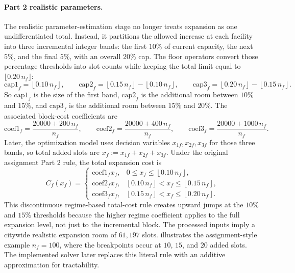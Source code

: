 \documentclass[11pt]{article}
\begin{document}
\paragraph{Part 2 realistic parameters.}
The realistic parameter-estimation stage no longer treats expansion as one undifferentiated total. Instead, it partitions the allowed increase at each facility into three incremental integer bands: the first \(10\%\) of current capacity, the next \(5\%\), and the final \(5\%\), with an overall \(20\%\) cap. The floor operators convert those percentage thresholds into slot counts while keeping the total limit equal to \(\lfloor 0.20\,n_f \rfloor\):
\[
\mathrm{cap1}_f = \left\lfloor 0.10\,n_f \right\rfloor,\qquad
\mathrm{cap2}_f = \left\lfloor 0.15\,n_f \right\rfloor - \left\lfloor 0.10\,n_f \right\rfloor,\qquad
\mathrm{cap3}_f = \left\lfloor 0.20\,n_f \right\rfloor - \left\lfloor 0.15\,n_f \right\rfloor.
\]
So \(\mathrm{cap1}_f\) is the size of the first band, \(\mathrm{cap2}_f\) is the additional room between \(10\%\) and \(15\%\), and \(\mathrm{cap3}_f\) is the additional room between \(15\%\) and \(20\%\). The associated block-cost coefficients are
\[
\mathrm{coef1}_f = \frac{20000 + 200\,n_f}{n_f},\qquad
\mathrm{coef2}_f = \frac{20000 + 400\,n_f}{n_f},\qquad
\mathrm{coef3}_f = \frac{20000 + 1000\,n_f}{n_f}.
\]
Later, the optimization model uses decision variables \(x_{1f},x_{2f},x_{3f}\) for those three bands, so total added slots are \(x_f := x_{1f}+x_{2f}+x_{3f}\). Under the original assignment Part 2 rule, the total expansion cost is
\[
C_f(x_f)=
\begin{cases}
\mathrm{coef1}_f x_f, & 0 \le x_f \le \left\lfloor 0.10\,n_f \right\rfloor,\\
\mathrm{coef2}_f x_f, & \left\lfloor 0.10\,n_f \right\rfloor < x_f \le \left\lfloor 0.15\,n_f \right\rfloor,\\
\mathrm{coef3}_f x_f, & \left\lfloor 0.15\,n_f \right\rfloor < x_f \le \left\lfloor 0.20\,n_f \right\rfloor.
\end{cases}
\]
This discontinuous regime-based total-cost rule creates upward jumps at the \(10\%\) and \(15\%\) thresholds because the higher regime coefficient applies to the full expansion level, not just to the incremental block. The processed inputs imply a citywide realistic expansion room of \(61{,}197\) slots.  illustrates the assignment-style example \(n_f=100\), where the breakpoints occur at \(10\), \(15\), and \(20\) added slots. The implemented solver later replaces this literal rule with an additive approximation for tractability.
\end{document}
